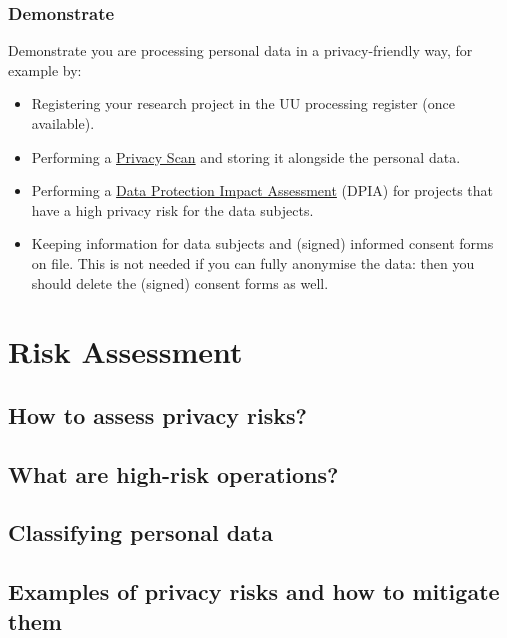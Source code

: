 \documentclass[
]{book}
\providecommand{\tightlist}{%
  \setlength{\itemsep}{0pt}\setlength{\parskip}{0pt}}
\begin{document}
\hypertarget{demonstrate}{%
\subsection{Demonstrate}\label{demonstrate}}

Demonstrate you are processing personal data in a privacy-friendly way, for
example by:

\begin{itemize}
\tightlist
\item
  Registering your research project in the UU processing register (once available).
\item
  Performing a \protect\hyperlink{privacy-scan}{Privacy Scan} and storing it alongside the personal data.
\item
  Performing a \protect\hyperlink{dpia}{Data Protection Impact Assessment} (DPIA) for
  projects that have a high privacy risk for the data subjects.
\item
  Keeping information for data subjects and (signed) informed consent forms on
  file. This is not needed if you can fully anonymise the data: then you should
  delete the (signed) consent forms as well.
\end{itemize}

\hypertarget{risk-assessment}{%
\chapter{Risk Assessment}\label{risk-assessment}}

\hypertarget{risk-assessment-how}{%
\section{How to assess privacy risks?}\label{risk-assessment-how}}

\hypertarget{high-risk-processing}{%
\section{What are high-risk operations?}\label{high-risk-processing}}

\hypertarget{data-classification}{%
\section{Classifying personal data}\label{data-classification}}

\hypertarget{example-risks}{%
\section{Examples of privacy risks and how to mitigate them}\label{example-risks}}
\end{document}
